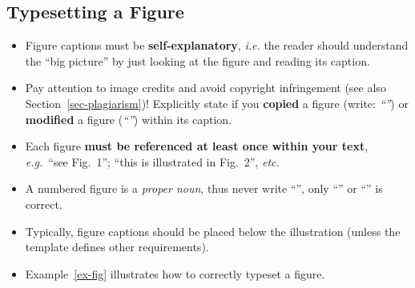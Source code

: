 \documentclass[11pt,a4paper]{article}
\begin{document}
\subsection{Typesetting a Figure}
\noindent

\begin{itemize}
 \item Figure captions must be \textbf{self-explanatory}, \emph{i.e.} the reader should understand the ``big picture'' by just looking at the figure and reading its caption.
 
 \item Pay attention to image credits and avoid copyright infringement (see also Section~\ref{sec-plagiarism})! Explicitly state if you \textbf{copied} a figure (write: \emph{``''}) or \textbf{modified} a figure (\emph{``''}) within its caption.
 
 \item Each figure \textbf{must be referenced at least once within your text}, \emph{e.g.}~``see Fig.~1''; ``this is illustrated in Fig.~2'', \emph{etc.}
 
 \item A numbered figure is a \emph{proper noun}, thus never write ``'', only ``'' or ``'' is correct.
 
 \item Typically, figure captions should be placed below the illustration (unless the template defines other requirements).
 
 \item Example~\ref{ex-fig} illustrates how to correctly typeset a figure.
\end{itemize}
\end{document}

